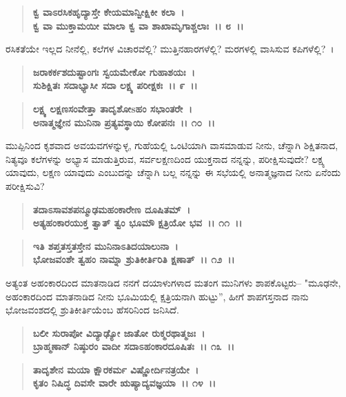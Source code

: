 \begin{verse}
\textbf{ಕ್ವ ವಾಽರಸಿಕಹೃದ್ಯಾಸ್ತೇ ಕೇಯಮಾನ್ವೀಕ್ಷಿಕೀ ಕಲಾ~।}\\\textbf{ಕ್ವ ವಾ ಮುಕ್ತಾಮಯೀ ಮಾಲಾ ಕ್ವ ವಾ ಶಾಖಾಮೃಗಾಶ್ಚಲಾಃ~।। ೮~।। }
\end{verse}

ರಸಿಕತೆಯೇ ಇಲ್ಲದ ನೀನೆಲ್ಲಿ, ಕಲೆಗಳ ವಿಚಾರವೆಲ್ಲಿ? ಮುತ್ತಿನಹಾರಗಳೆಲ್ಲಿ? ಮರಗಳಲ್ಲಿ ವಾಸಿಸುವ ಕಪಿಗಳೆಲ್ಲಿ?~।

\begin{verse}
\textbf{ಜರಾಕರ್ಕಶದುಷ್ಟಾಂಗಃ ಸ್ವಯಮೇಕೋ ಗುಹಾಶಯಃ~।}\\\textbf{ಸುಶಿಕ್ಷಿತಃ ಸದಾಭ್ಯಾಸೀ ಸದಾ ಲಕ್ಷ್ಯ ಪರೀಕ್ಷಕಃ~।। ೯~।। }
\end{verse}

\begin{verse}
\textbf{ಲಕ್ಷ್ಯ ಲಕ್ಷಣಸಂವೇತ್ತಾ ತಾದೃಶೋsಹಂ ಸಭಾಂತರೇ~।}\\\textbf{ಅನಾತ್ಮಜ್ಞೇನ ಮುನಿನಾ ಪ್ರತ್ಯವಸ್ಥಾಯಿ ಕೋಪನಃ~।। ೧೦~।।}
\end{verse}

ಮುಪ್ಪಿನಿಂದ ಕೃಶವಾದ ಅವಯವಗಳನ್ನುಳ್ಳ, ಗುಹೆಯಲ್ಲಿ ಒಂಟಿಯಾಗಿ ವಾಸಮಾಡುವ ನೀನು, ಚೆನ್ನಾಗಿ ಶಿಕ್ಷಿತನಾದ, ನಿತ್ಯವೂ ಕಲೆಗಳನ್ನು ಅಭ್ಯಾಸ ಮಾಡುತ್ತಿರುವ, ಸರ್ವಲಕ್ಷಣದಿಂದ ಯುಕ್ತನಾದ ನನ್ನನ್ನು, ಪರೀಕ್ಷಿಸುವುದೇ? ಲಕ್ಷ್ಯ ಯಾವುದು, ಲಕ್ಷಣ ಯಾವುದು ಎಂಬುದನ್ನು ಚೆನ್ನಾಗಿ ಬಲ್ಲ ನನ್ನನ್ನು ಈ ಸಭೆಯಲ್ಲಿ ಅನಾತ್ಮಜ್ಞನಾದ ನೀನು ಏನೆಂದು ಪರೀಕ್ಷಿಸುವಿ?

\begin{verse}
\textbf{ತದಾಽಸಾವಶಪನ್ಮೂಢಮಹಂಕಾರೇಣ ದೂಷಿತಮ್~।}\\\textbf{ಅತ್ಯಹಂಕಾರಯುಕ್ತ ತ್ವಾತ್ ತ್ವಂ ಭೂಮೌ ಕ್ಷತ್ರಿಯೋ ಭವ~।। ೧೧~।।} 
\end{verse}

\begin{verse}
\textbf{ಇತಿ ಶಪ್ತತಸ್ತತಸ್ತೇನ ಮುನಿನಾಽತಿದಯಾಲುನಾ~।}\\\textbf{ಭೋಜವಂಶೇ ತ್ವಹಂ ನಾಮ್ನಾ ಶ್ರುತಿಕೀರ್ತಿರಿತಿ ಕ್ಷಣಾತ್~।। ೧೨~।।} 
\end{verse}

ಅತ್ಯಂತ ಅಹಂಕಾರದಿಂದ ಮಾತನಾಡಿದ ನನಗೆ ದಯಾಳುಗಳಾದ ಮತಂಗ ಮುನಿಗಳು ಶಾಪಕೊಟ್ಟರು– "ಮೂಢನೇ, ಅಹಂಕಾರದಿಂದ ಮಾತನಾಡಿದ ನೀನು ಭೂಮಿಯಲ್ಲಿ ಕ್ಷತ್ರಿಯನಾಗಿ ಹುಟ್ಟು”, ಹೀಗೆ ಶಾಪಗಸ್ತನಾದ ನಾನು ಭೋಜವಂಶದಲ್ಲಿ ಶ್ರುತಿಕೀರ್ತಿಯೆಂಬ ಹೆಸರಿನಿಂದ ಜನಿಸಿದೆ.

\begin{verse}
\textbf{ಬಲೀ ಸುರಾಪೋ ವಿದ್ಯಾಢ್ಯೋ ಜಾತೋ ರುಕ್ಮರಥಾತ್ಮಜಃ~।}\\\textbf{ಬ್ರಾಹ್ಮಣಾನ್ ನಿಷ್ಠುರಂ ವಾದೀ ಸದಾಽಹಂಕಾರದೂಷಿತಃ~।। ೧೩~।। }
\end{verse}

\begin{verse}
\textbf{ತಾದೃಶೇನ ಮಯಾ ಕ್ಷೌರಕರ್ಮ ವಿಷ್ಣೋರ್ದಿನತ್ರಯೇ~।}\\\textbf{ಕೃತಂ ನಿಷಿದ್ಧ ದಿವಸೇ ವಾರೇ ಋಷ್ಯಾದ್ಯವಜ್ಞಯಾ~।। ೧೪~।।}
\end{verse}

